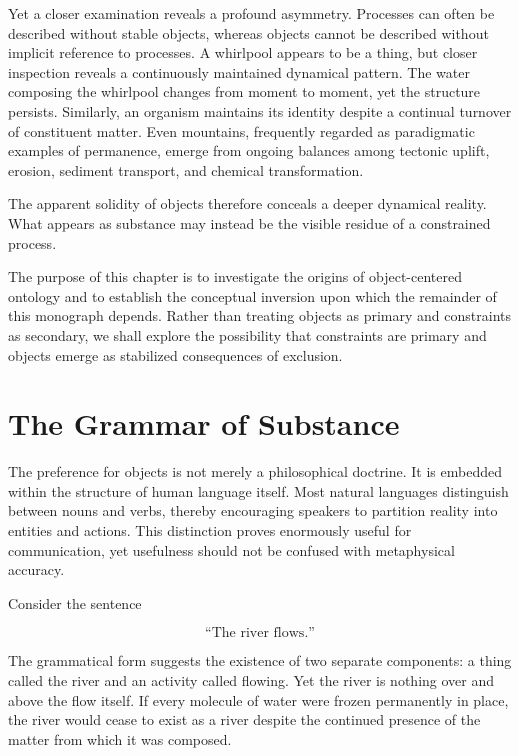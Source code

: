 \documentclass[11pt,oneside]{book}
\theoremstyle{plain}
\theoremstyle{definition}
\theoremstyle{remark}
\begin{document}
Yet a closer examination reveals a profound asymmetry. Processes can often be described without stable objects, whereas objects cannot be described without implicit reference to processes. A whirlpool appears to be a thing, but closer inspection reveals a continuously maintained dynamical pattern. The water composing the whirlpool changes from moment to moment, yet the structure persists. Similarly, an organism maintains its identity despite a continual turnover of constituent matter. Even mountains, frequently regarded as paradigmatic examples of permanence, emerge from ongoing balances among tectonic uplift, erosion, sediment transport, and chemical transformation.

The apparent solidity of objects therefore conceals a deeper dynamical reality. What appears as substance may instead be the visible residue of a constrained process.

The purpose of this chapter is to investigate the origins of object-centered ontology and to establish the conceptual inversion upon which the remainder of this monograph depends. Rather than treating objects as primary and constraints as secondary, we shall explore the possibility that constraints are primary and objects emerge as stabilized consequences of exclusion.

\section{The Grammar of Substance}

The preference for objects is not merely a philosophical doctrine. It is embedded within the structure of human language itself. Most natural languages distinguish between nouns and verbs, thereby encouraging speakers to partition reality into entities and actions. This distinction proves enormously useful for communication, yet usefulness should not be confused with metaphysical accuracy.

Consider the sentence

\begin{equation}
\text{``The river flows.''}
\end{equation}

The grammatical form suggests the existence of two separate components: a thing called the river and an activity called flowing. Yet the river is nothing over and above the flow itself. If every molecule of water were frozen permanently in place, the river would cease to exist as a river despite the continued presence of the matter from which it was composed.
\end{document}
